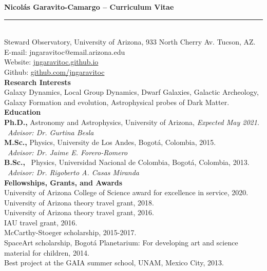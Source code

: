 \documentclass[UTF8]{article}
\begin{document}
\indent \textbf{\LARGE Nicol\'as Garavito-Camargo -- Curriculum Vitae} \\
\indent \rule{17cm}{0.4pt}\\

\indent\indent Steward Observatory, University of Arizona, 933 North Cherry Av. Tucson, AZ.\\
\indent\indent E-mail: jngaravitoc@email.arizona.edu\\ 
\indent\indent Website: \href{http://jngaravitoc.github.io/Garavito-Camargo}{jngaravitoc.github.io}\\
\indent\indent Github: \href{http://www.github.com/jngaravitoc}{github.com/jngaravitoc} \\

{\Large \textbf{Research Interests}}\\

\indent\indent Galaxy Dynamics, Local Group Dynamics, Dwarf Galaxies, Galactic
Archeology, Galaxy Formation and evolution, 
\indent\indent Astrophysical probes of Dark
Matter.\\


{\Large \textbf{Education}}\\


\indent\indent \textbf{Ph.D.,} Astronomy and Astrophysics, University of
Arizona, \textit{Expected May 2021}.\\
\indent\indent\indent\indent \ \textit{Advisor: Dr. Gurtina Besla}\\

\indent\indent\textbf{M.Sc.,}  Physics, University de Los Andes, Bogot\'a, Colombia, 2015.\\
\indent\indent\indent\indent \ \textit{Advisor: Dr. Jaime E. Forero-Romero}\\

\indent\indent\textbf{B.Sc.,} \  Physics, Universidad Nacional de Colombia, Bogot\'a, Colombia, 2013.\\
\indent\indent\indent\indent \ \textit{Advisor: Dr. Rigoberto A. Casas Miranda}\\

{\Large{\textbf{Fellowships, Grants, and Awards}}}\\

\indent\indent University of Arizona College of Science award for excellence in service, 2020. \\
\indent\indent University of Arizona theory travel grant, 2018. \\
\indent\indent University of Arizona theory travel grant, 2016. \\
\indent\indent IAU travel grant, 2016.\\
\indent\indent McCarthy-Stoeger scholarship, 2015-2017.\\
\indent\indent SpaceArt scholarship, Bogot\'a Planetarium: For developing art and science material for children, 2014. \\
\indent\indent Best project at the GAIA summer school, UNAM, Mexico City, 2013.\\
\end{document}
